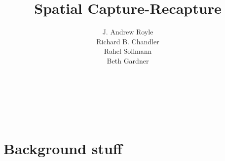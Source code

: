 \documentclass{book}
\begin{document}
\title{ Spatial Capture-Recapture  }
\subtitle{
}
\author{J. Andrew Royle \\
Richard B. Chandler \\
Rahel Sollmann \\
Beth Gardner}


\address{
USGS Patuxent Wildlife Research Center \\
North Carolina State University
}

\maketitle

\newpage


\setcounter{tocdepth}{2}
\tableofcontents


\newpage

\hspace*{-.166in}{\LARGE Preface} \\

\vspace*{.2in}



\newpage

\hspace*{-.166in}{\LARGE Acknowledgements} \\

\vspace*{.2in}

%

\newpage



\mainmatter




\part{Background stuff}


\end{document}
